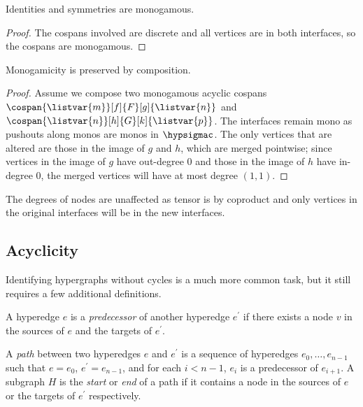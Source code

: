 \begin{lemma}\label{lem:identities-symmetries-monogamous}
    Identities and symmetries are monogamous.
\end{lemma}
\begin{proof}
    The cospans involved are discrete and all vertices are in both
    interfaces, so the cospans are monogamous.
\end{proof}

\begin{lemma}\label{lem:monogamicity-preserved-composition}
    Monogamicity is preserved by composition.
\end{lemma}
\begin{proof}
    Assume we compose two monogamous acyclic cospans \(
        \cospan{\listvar{m}}[f]{F}[g]{\listvar{n}}
    \) and \(
        \cospan{\listvar{n}}[h]{G}[k]{\listvar{p}}
    \).
    The interfaces remain mono as pushouts along monos are monos in
    \(\hypsigmac\). The only vertices that are altered are those in the image of
    \(g\) and \(h\), which are merged pointwise; since vertices in the image of
    \(g\) have out-degree \(0\) and those in the image of \(h\) have in-degree
    \(0\), the merged vertices will have at most degree \((1, 1)\).
\end{proof}

\begin{lemma}\label{lem:monogamicity-preserved-tensor}
    The degrees of nodes are unaffected as tensor is by coproduct and
    only vertices in the original interfaces will be in the new interfaces.
\end{lemma}

\subsection{Acyclicity}

Identifying hypergraphs without cycles is a much more common task, but it still
requires a few additional definitions.

\begin{definition}
    A hyperedge \(e\) is a \emph{predecessor} of another hyperedge \(e^\prime\)
    if there exists a node \(v\) in the sources of \(e\) and the targets of
    \(e^\prime\).
\end{definition}

\begin{definition}
    A \emph{path} between two hyperedges \(e\) and \(e^\prime\) is a sequence of
    hyperedges \(e_0, \dots, e_{n-1}\) such that \(e = e_0\),
    \(e^\prime = e_{n-1}\), and for each \(i < n-1\), \(e_i\) is a predecessor
    of \(e_{i+1}\).
    A subgraph \(H\) is the \emph{start} or \emph{end} of a path if it contains
    a node in the sources of \(e\) or the targets of \(e^\prime\) respectively.
\end{definition}

